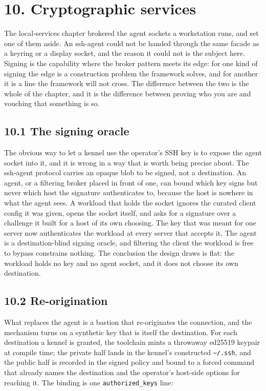 \hypertarget{cryptographic-services}{%
\chapter{10. Cryptographic services}\label{cryptographic-services}}

The local-services chapter brokered the agent sockets a workstation
runs, and set one of them aside. An ssh-agent could not be handed
through the same facade as a keyring or a display socket, and the reason
it could not is the subject here. Signing is the capability where the
broker pattern meets its edge: for one kind of signing the edge is a
construction problem the framework solves, and for another it is a line
the framework will not cross. The difference between the two is the
whole of the chapter, and it is the difference between proving who you
are and vouching that something is so.

\hypertarget{the-signing-oracle}{%
\section{10.1 The signing oracle}\label{the-signing-oracle}}

The obvious way to let a kennel use the operator's SSH key is to expose
the agent socket into it, and it is wrong in a way that is worth being
precise about. The ssh-agent protocol carries an opaque blob to be
signed, not a destination. An agent, or a filtering broker placed in
front of one, can bound which key signs but never which host the
signature authenticates to, because the host is nowhere in what the
agent sees. A workload that holds the socket ignores the curated client
config it was given, opens the socket itself, and asks for a signature
over a challenge it built for a host of its own choosing. The key that
was meant for one server now authenticates the workload at every server
that accepts it. The agent is a destination-blind signing oracle, and
filtering the client the workload is free to bypass constrains nothing.
The conclusion the design draws is flat: the workload holds no key and
no agent socket, and it does not choose its own destination.

\hypertarget{re-origination}{%
\section{10.2 Re-origination}\label{re-origination}}

What replaces the agent is a bastion that re-originates the connection,
and the mechanism turns on a synthetic key that is itself the
destination. For each destination a kennel is granted, the toolchain
mints a throwaway ed25519 keypair at compile time; the private half
lands in the kennel's constructed \texttt{\textasciitilde{}/.ssh}, and
the public half is recorded in the signed policy and bound to a forced
command that already names the destination and the operator's host-side
options for reaching it. The binding is one \texttt{authorized\_keys}
line:

